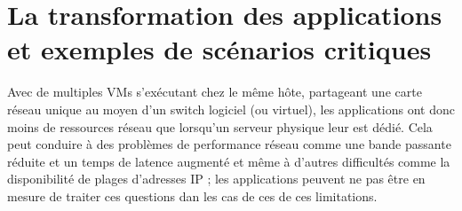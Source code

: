 \section{La transformation des applications et exemples de scénarios critiques}

Avec de multiples VMs s'exécutant chez le même hôte, partageant une carte réseau unique au moyen d'un switch logiciel (ou virtuel), les applications ont donc moins de ressources réseau que lorsqu'un serveur physique leur est dédié. Cela peut conduire à des problèmes de performance réseau comme une bande passante réduite et un temps de latence augmenté et même à d'autres difficultés comme la disponibilité de plages d'adresses IP ; les applications peuvent ne pas être en mesure de traiter ces questions dan les cas de ces de ces limitations.





